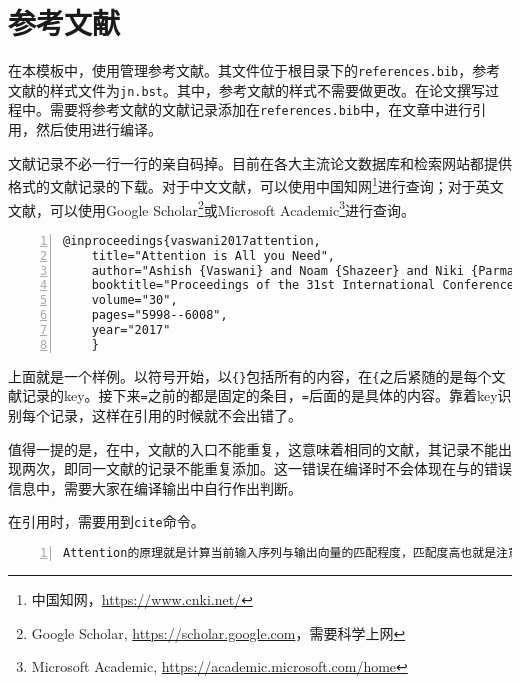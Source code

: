 \section{参考文献}

在本模板中，使用\BibTeX{}管理参考文献。其文件位于根目录下的\texttt{references.bib}，参考文献的样式文件为\texttt{jn.bst}。其中，参考文献的样式不需要做更改。在论文撰写过程中。需要将参考文献的\BibTeX{}文献记录添加在\texttt{references.bib}中，在文章中进行引用，然后使用\XeLaTeX{}进行编译。

文献记录不必一行一行的亲自码掉。目前在各大主流论文数据库和检索网站都提供\BibTeX{}格式的文献记录的下载。对于中文文献，可以使用中国知网\footnote{中国知网，\url{https://www.cnki.net/}}进行查询；对于英文文献，可以使用Google Scholar\footnote{Google Scholar, \url{https://scholar.google.com}，需要科学上网}或Microsoft Academic\footnote{Microsoft Academic, \url{https://academic.microsoft.com/home}}进行查询。

\begin{lstlisting}[language=tex, breaklines=true, basicstyle=\ttfamily, numbers=left, numberstyle=\tiny, frame=shadowbox]
    @inproceedings{vaswani2017attention,
	title="Attention is All you Need",
	author="Ashish {Vaswani} and Noam {Shazeer} and Niki {Parmar} and Jakob {Uszkoreit} and Llion {Jones} and Aidan N. {Gomez} and Lukasz {Kaiser} and Illia {Polosukhin}",
	booktitle="Proceedings of the 31st International Conference on Neural Information Processing Systems",
	volume="30",
	pages="5998--6008",
	year="2017"
    }
\end{lstlisting}


上面就是一个\BibTeX{}样例。以\texttt{\@}符号开始，以\texttt{\{\}}包括所有的内容，在\texttt{\{}之后紧随的是每个文献记录的key。接下来\texttt{=}之前的都是固定的条目，\texttt{=}后面的是具体的内容。\BibTeX{}靠着key识别每个记录，这样在引用的时候就不会出错了。

值得一提的是，在\BibTeX{}中，文献的入口不能重复，这意味着相同的文献，其记录不能出现两次，即同一文献的记录不能重复添加。这一错误在编译时不会体现在\XeLaTeX{}与\BibTeX{}的错误信息中，需要大家在编译输出中自行作出判断。

在引用时，需要用到\texttt{cite}命令。

\begin{lstlisting}[language=tex, breaklines=true, basicstyle=\ttfamily, numbers=left, numberstyle=\tiny, frame=shadowbox]
    Attention的原理就是计算当前输入序列与输出向量的匹配程度，匹配度高也就是注意力集中点其相对的得分越高，其中Attention计算得到的匹配度权重，只限于当前序列对，不是像网络模型权重这样的整体权重\cite{vaswani2017attention}。
\end{lstlisting}

